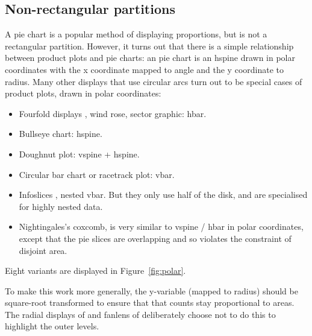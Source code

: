 \documentclass[letterpaper,oneside]{scrartcl}
\begin{document}
\subsection{Non-rectangular partitions}

A pie chart is a popular method of displaying proportions, but is not a rectangular partition. However, it turns out that there is a simple relationship between product plots and pie charts: an pie chart is an hspine drawn in polar coordinates with the x coordinate mapped to angle and the y coordinate to radius. Many other displays that use circular arcs turn out to be special cases of product plots, drawn in polar coordinates:

\begin{itemize}
  \item Fourfold displays \citep{friendly:1995}, wind rose, sector graphic: hbar.

  \item Bullseye chart: hspine.

  \item Doughnut plot: vspine + hspine.

  \item Circular bar chart or racetrack plot: vbar.

  \item Infoslices \citep{andrews:1998}, nested vbar. But they only use half of the disk, and are specialised for highly nested data.

  \item Nightingales's coxcomb, is very similar to vspine / hbar in polar coordinates, except that the pie slices are overlapping and so violates the constraint of disjoint area.
\end{itemize}

\noindent Eight variants are displayed in Figure~\ref{fig:polar}.

To make this work more generally, the y-variable (mapped to radius) should be square-root transformed to ensure that that counts stay proportional to areas. The radial displays of \citet{stasko:2000} and fanlens of \citet{lou:2007} deliberately choose not to do this to highlight the outer levels.
\end{document}

